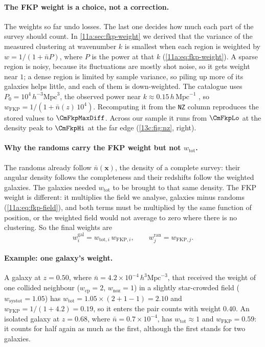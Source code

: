 \paragraph{The FKP weight is a choice, not a correction.}
The weights so far undo losses. The last one decides how much each part of the
survey should count. In \cref{11a:sec:fkp-weight} we derived that the variance of
the measured clustering at wavenumber $k$ is smallest when each region is weighted by
$w=1/(1+\bar nP)$, where $P$ is the power at that $k$ (\cref{11a:eq:fkp-weight}). A
sparse region is noisy, because its fluctuations are mostly shot noise, so it gets
weight near $1$; a dense region is limited by sample variance, so piling up more of
its galaxies helps little, and each of them is down-weighted. The catalogue uses
$P_0=10^4\,h^{-3}\mathrm{Mpc}^3$, the observed power near $k\approx0.15\,h\,
\mathrm{Mpc}^{-1}$ , so
$w_{\mathrm{FKP}}=1/(1+\bar n(z)\,10^4)$. Recomputing it from the \texttt{NZ}
column reproduces the stored values to $\CmFkpMaxDiff$. Across our sample it runs from
$\CmFkpLo$ at the density peak to $\CmFkpHi$ at the far edge (\cref{13c:fig:nz},
right).

\paragraph{Why the randoms carry the FKP weight but not $w_{\mathrm{tot}}$.}
The randoms already follow $\bar n(\bm x)$, the density of a complete survey: their
angular density follows the completeness and their redshifts follow the weighted
galaxies. The galaxies needed $w_{\mathrm{tot}}$ to be brought to that same density.
The FKP weight is different: it multiplies the field we analyse, galaxies minus
randoms (\cref{11a:eq:fkp-field}), and both terms must be multiplied by the same
function of position, or the weighted field would not average to zero where there is
no clustering. So the final weights are 
\begin{equation}
  w_i^{\mathrm{gal}}=w_{\mathrm{tot},i}\,w_{\mathrm{FKP},i},\qquad
  w_j^{\mathrm{ran}}=w_{\mathrm{FKP},j}.
  \label{13c:eq:final-weights}
\end{equation}

\paragraph{Example: one galaxy's weight.}
A galaxy at $z=0.50$, where $\bar n=4.2\times10^{-4}\,h^3\mathrm{Mpc}^{-3}$, that
received the weight of one collided neighbour ($w_{\mathrm{cp}}=2$, $w_{\mathrm{noz}}=1$)
in a slightly star-crowded field ($w_{\mathrm{systot}}=1.05$) has
$w_{\mathrm{tot}}=1.05\times(2+1-1)=2.10$ and $w_{\mathrm{FKP}}=1/(1+4.2)=0.19$, so it
enters the pair counts with weight $0.40$. An isolated galaxy at $z=0.68$, where
$\bar n=0.7\times10^{-4}$, has $w_{\mathrm{tot}}\approx1$ and $w_{\mathrm{FKP}}=0.59$: it
counts for half again as much as the first, although the first stands for two galaxies.

